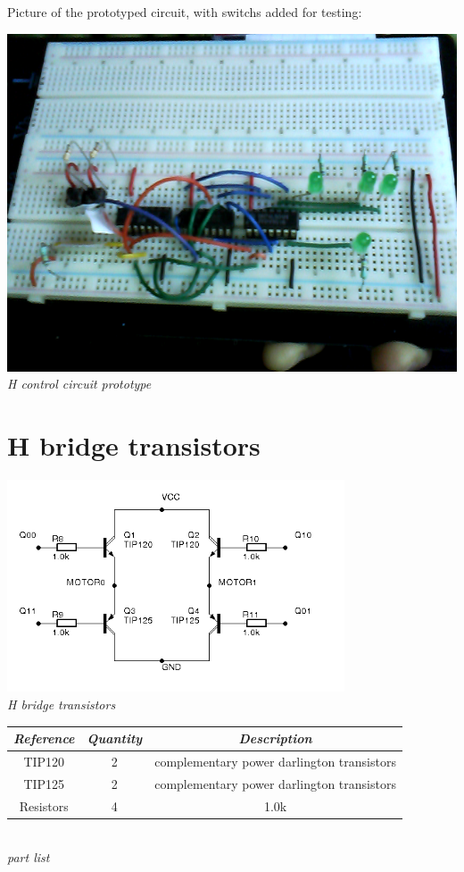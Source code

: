 \documentclass[12pt]{article}
\begin{document}
\smallskip
\pagebreak
Picture of the prototyped circuit, with switchs added for testing:
\begin{center}
  \includegraphics[keepaspectratio=true, width=1.\textwidth]{../pics/h_control_breadboard.png}
  \\
  \smallskip
  \tiny{\textit{H control circuit prototype}}
\end{center}


\newpage
\section{H bridge transistors}

\begin{center}
  \includegraphics[keepaspectratio=true, width=100mm]{../pics/h_transistors.png}
  \\
  \smallskip
  \tiny{\textit{H bridge transistors}}
\end{center}

\smallskip
\begin{center}
  \begin{tabular}{|c|c|c|}
    \hline
    \textit{Reference} & \textit{Quantity} & \textit{Description} \\
    \hline
    TIP120 & 2 & complementary power darlington transistors \\
    \hline
    TIP125 & 2 & complementary power darlington transistors \\
    \hline
    Resistors & 4 &  1.0k \\
    \hline
  \end{tabular}
  \\
  \smallskip
  \tiny{\textit{part list}}
\end{center}
\end{document}
